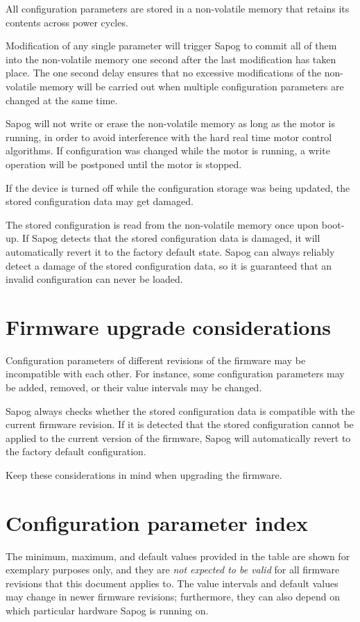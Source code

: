 \documentclass{zubaxdoc}
\begin{document}
All configuration parameters are stored in a non-volatile memory
that retains its contents across power cycles.

Modification of any single parameter will trigger Sapog to commit all of them into the non-volatile
memory one second after the last modification has taken place.
The one second delay ensures that no excessive modifications of the non-volatile memory will be carried out
when multiple configuration parameters are changed at the same time.

Sapog will not write or erase the non-volatile memory as long as the motor is running, in order to
avoid interference with the hard real time motor control algorithms.
If configuration was changed while the motor is running,
a write operation will be postponed until the motor is stopped.

If the device is turned off while the configuration storage was being updated,
the stored configuration data may get damaged.

The stored configuration is read from the non-volatile memory once upon boot-up.
If Sapog detects that the stored configuration data is damaged,
it will automatically revert it to the factory default state.
Sapog can always reliably detect a damage of the stored configuration data,
so it is guaranteed that an invalid configuration can never be loaded.

\section{Firmware upgrade considerations}

Configuration parameters of different revisions of the firmware may be incompatible with each other.
For instance, some configuration parameters may be added, removed, or their value intervals may be changed.

Sapog always checks whether the stored configuration data is compatible with the current firmware revision.
If it is detected that the stored configuration cannot be applied to the current version of the firmware,
Sapog will automatically revert to the factory default configuration.

Keep these considerations in mind when upgrading the firmware.

\section{Configuration parameter index}

The minimum, maximum, and default values provided in the table are shown for exemplary purposes only,
and they are \emph{not expected to be valid} for all firmware revisions that this document applies to.
The value intervals and default values may change in newer firmware revisions; furthermore,
they can also depend on which particular hardware Sapog is running on.
\end{document}
